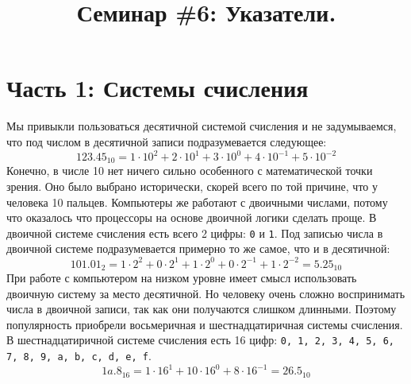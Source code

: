 \documentclass{article}
\begin{document}


\title{Семинар \#6: Указатели. \vspace{-5ex}}\date{}\maketitle
\section*{Часть 1: Системы счисления}
Мы привыкли пользоваться десятичной системой счисления и не задумываемся, что под числом в десятичной записи подразумевается следующее:
$$
123.45_{10} = 1 \cdot 10^2 + 2 \cdot 10^1 + 3 \cdot 10^0 + 4 \cdot 10^{-1} + 5 \cdot 10^{-2}
$$
Конечно, в числе 10 нет ничего сильно особенного с математической точки зрения. Оно было выбрано исторически, скорей всего по той причине, что у человека 10 пальцев. Компьютеры же работают с двоичными числами, потому что оказалось что процессоры на основе двоичной логики сделать проще. В двоичной системе счисления есть всего 2 цифры: \texttt{0} и \texttt{1}. Под записью числа в двоичной системе подразумевается примерно то же самое, что и в десятичной:
$$
101.01_2 = 1 \cdot 2^2 + 0 \cdot 2^1 + 1 \cdot 2^0 + 0 \cdot 2^{-1} + 1 \cdot 2^{-2} = 5.25_{10}
$$
При работе с компьютером на низком уровне имеет смысл использовать двоичную систему за место десятичной.  Но человеку очень сложно воспринимать числа в двоичной записи, так как они получаются слишком длинными. Поэтому популярность приобрели восьмеричная и шестнадцатиричная системы счисления. В шестнадцатиричной системе счисления есть 16 цифр: \texttt{0, 1, 2, 3, 4, 5, 6, 7, 8, 9, a, b, c, d, e, f}.
$$
1a.8_{16} = 1 \cdot 16^1 + 10 \cdot 16^0 + 8 \cdot 16^{-1} = 26.5_{10}
$$
\end{document}
